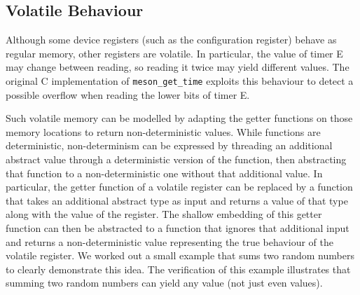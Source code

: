 \subsection{Volatile Behaviour}%

Although some device registers (such as the configuration register)
behave as regular memory, other registers are volatile. In particular, the value of 
timer E may change between reading, so reading it twice may yield different values.
The original C implementation of \lstinline{meson_get_time} exploits this behaviour
to detect a possible overflow when reading the lower bits of timer E. 

Such volatile memory can be modelled by adapting the getter functions on those
memory locations to return non-deterministic values. While \cogent functions
are deterministic, non-determinism  can be expressed by threading an additional
abstract value through a deterministic version of the function, then
abstracting that function to a non-deterministic one without that additional
value. In particular, the getter function of a volatile register can be
replaced by a function that takes an additional abstract type as input and
returns a value of that type along with the value of the register. The shallow
embedding of this getter function can then be abstracted to a function that
ignores that additional input and returns a non-deterministic value representing
the true behaviour of the volatile register. We worked out a small example that
sums two random numbers to clearly demonstrate this idea. The verification of
this example illustrates that summing two random numbers can yield any value
(not just even values). 



